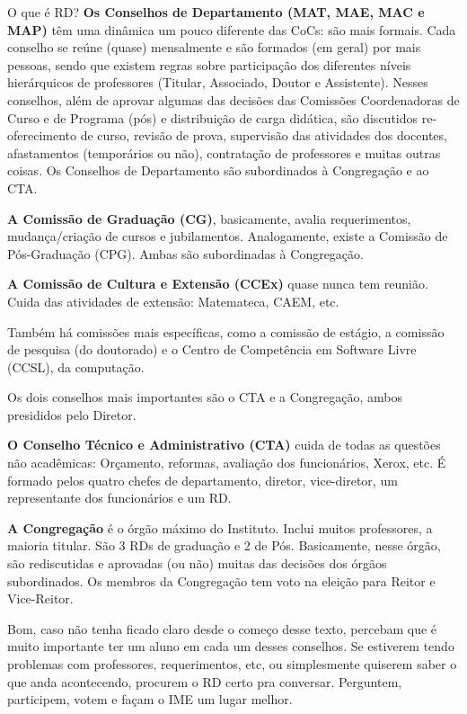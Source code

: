 \begin{secao}{O que é RD?}
{\bf Os Conselhos de Departamento (MAT, MAE, MAC e MAP)} têm uma dinâmica um
pouco diferente das CoCs: são mais formais. Cada conselho se reúne (quase)
mensalmente e são formados (em geral) por mais pessoas, sendo que existem
regras sobre participação dos diferentes níveis hierárquicos de
professores (Titular, Associado, Doutor e Assistente). Nesses conselhos, além
de aprovar algumas das decisões das Comissões Coordenadoras de Curso e de
Programa (pós) e distribuição de carga didática, são discutidos re-oferecimento
de curso, revisão de prova, supervisão das atividades dos docentes,
afastamentos (temporários ou não), contratação de professores e muitas outras
coisas.
Os Conselhos de Departamento são subordinados à Congregação e ao CTA.

{\bf A Comissão de Graduação (CG)}, basicamente, avalia requerimentos,
mudança/criação de cursos e jubilamentos. Analogamente, existe a Comissão de
Pós-Graduação (CPG). Ambas são subordinadas à Congregação.

{\bf A Comissão de Cultura e Extensão (CCEx)} quase nunca tem reunião. Cuida
das atividades de extensão: Matemateca, CAEM, etc.

Também há comissões mais específicas, como a comissão de estágio, a comissão de 
pesquisa (do doutorado) e o Centro de Competência em Software Livre (CCSL), da computação.

Os dois conselhos mais importantes são o CTA e a Congregação, ambos presididos
pelo Diretor.

{\bf O Conselho Técnico e Administrativo (CTA)} cuida de todas as questões não
acadêmicas: Orçamento, reformas, avaliação dos funcionários, Xerox, etc. É 
formado pelos quatro chefes de departamento, diretor, vice-diretor, um
representante dos funcionários e um RD.

{\bf A Congregação} é o órgão máximo do Instituto. Inclui muitos professores, a
maioria titular. São 3 RDs de graduação e 2 de Pós. Basicamente,
nesse órgão, são rediscutidas e aprovadas (ou não) muitas das decisões
dos órgãos subordinados. Os membros da Congregação tem voto na eleição para
Reitor e Vice-Reitor.


Bom, caso não tenha ficado claro desde o começo desse texto, percebam que é 
muito importante ter um aluno em cada um desses conselhos. Se estiverem tendo 
problemas com professores, requerimentos, etc, ou simplesmente quiserem saber 
o que anda acontecendo, procurem o RD certo pra conversar. Perguntem, participem, 
votem e façam o IME um lugar melhor.

\end{secao}
